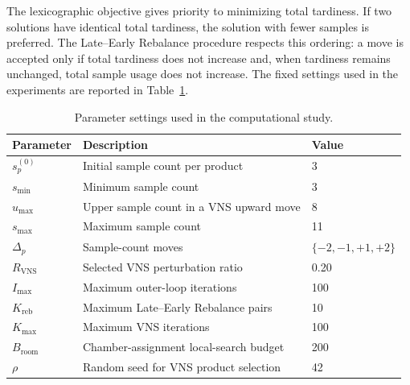 \documentclass[11pt]{article}
\begin{document}
The lexicographic objective gives priority to minimizing total tardiness. If two solutions have identical total tardiness, the solution with fewer samples is preferred. The Late--Early Rebalance procedure respects this ordering: a move is accepted only if total tardiness does not increase and, when tardiness remains unchanged, total sample usage does not increase. The fixed settings used in the experiments are reported in Table~\ref{tab:param_settings_final}.

\begin{table}[H]
\centering
\caption{Parameter settings used in the computational study.}
\label{tab:param_settings_final}
\begin{tabular}{lll}
\hline
\textbf{Parameter} & \textbf{Description} & \textbf{Value} \\
\hline
\(s_p^{(0)}\) & Initial sample count per product & 3 \\
\(s_{\min}\) & Minimum sample count & 3 \\
\(u_{\max}\) & Upper sample count in a VNS upward move & 8 \\
\(s_{\max}\) & Maximum sample count & 11 \\
\(\Delta_p\) & Sample-count moves & \(\{-2,-1,+1,+2\}\) \\
\(R_{\mathrm{VNS}}\) & Selected VNS perturbation ratio & 0.20 \\
\(I_{\max}\) & Maximum outer-loop iterations & 100 \\
\(K_{\mathrm{reb}}\) & Maximum Late--Early Rebalance pairs & 10 \\
\(K_{\max}\) & Maximum VNS iterations & 100 \\
\(B_{\mathrm{room}}\) & Chamber-assignment local-search budget & 200 \\
\(\rho\) & Random seed for VNS product selection & 42 \\
\hline
\end{tabular}
\end{table}
\end{document}

